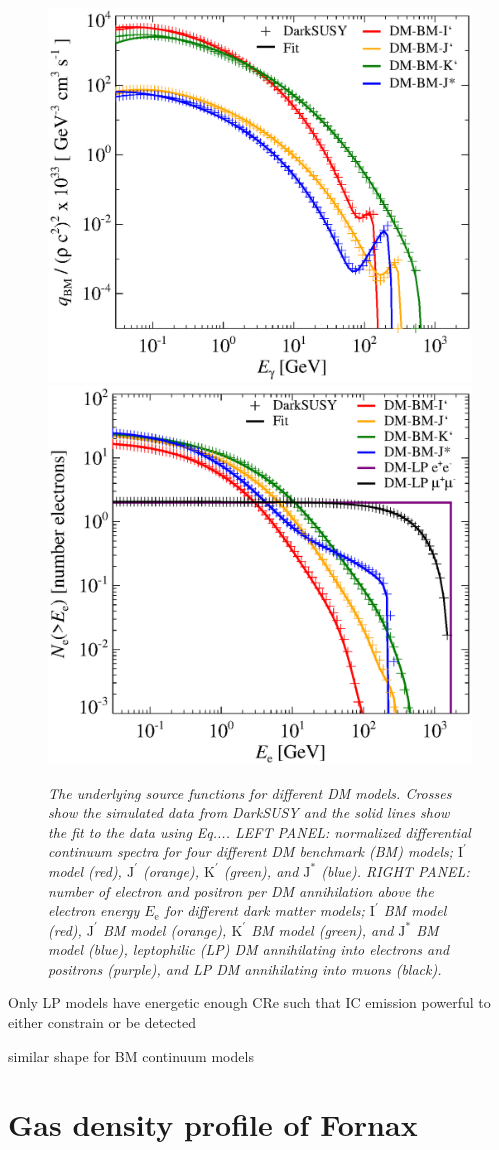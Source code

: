 \documentclass[10pt,aps,pra,reprint,amsmath,amsfonts,amssymb,showpacs]{revtex4-1}
\newcommand{\rmn}{\mathrm}
\newcommand{\ee}{E_\rmn{e}}
\newcommand{\Kp}{\rmn{K}^\prime}
\newcommand{\Ip}{\rmn{I}^\prime}
\newcommand{\Js}{\rmn{J}^*}
\newcommand{\Jp}{\rmn{J}^\prime}
\begin{document}
\begin{figure}
\begin{minipage}{2.0\columnwidth}
 \includegraphics[width=0.49\columnwidth]{figures/fit.ds.flux.eps}
 \includegraphics[width=0.49\columnwidth]{figures/fit.epflux.int.eps}
\caption{\it The underlying source functions for different DM
  models. Crosses show the simulated data from DarkSUSY and the solid
  lines show the fit to the data using Eq.... LEFT PANEL: normalized
  differential continuum spectra for four different DM benchmark (BM)
  models; $\Ip$ model (red), $\Jp$ (orange), $\Kp$ (green), and
  $\Js$ (blue). RIGHT PANEL: number of electron and positron per DM
  annihilation above the electron energy $\ee$ for different dark
  matter models; $\Ip$ BM model (red), $\Jp$ BM model (orange),
  $\Kp$ BM model (green), and $\Js$ BM model (blue), leptophilic (LP)
  DM annihilating into electrons and positrons (purple), and LP DM
  annihilating into muons (black).}
 \label{fig:q_DM}
\end{minipage}
\end{figure}
Only LP models have energetic enough CRe such that IC emission
powerful to either constrain or be detected

similar shape for BM continuum models


\section{Gas density profile of Fornax}
\end{document}
